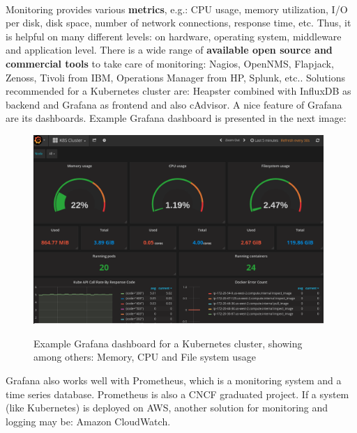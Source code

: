 \paragraph{}
Monitoring provides various \textbf{metrics}, e.g.: CPU usage, memory utilization, I/O per disk, disk space, number of network connections, response time, etc. Thus, it is helpful on many different levels: on hardware, operating system,  middleware and application level. There is a wide range of \textbf{available open source and commercial tools} to take care of monitoring: Nagios, OpenNMS, Flapjack, Zenoss, Tivoli from IBM, Operations Manager from HP, Splunk, etc.\cite{book-cicd}. Solutions recommended for a Kubernetes cluster are: Heapster combined with InfluxDB as backend and Grafana as frontend and also cAdvisor\cite{book-mastering-k8s}. A nice feature of Grafana are its dashboards. Example Grafana dashboard is presented in the next image:
\begin{figure}[H]
  \centering
  \includegraphics[width=11cm]{figures/grafana.png}
  \label{fig:grafana}
  \caption{Example Grafana dashboard for a Kubernetes cluster, showing among others: Memory, CPU and File system usage\cite{monitor-kubernetes-cluster-prometheus-grafana}}
\end{figure}
Grafana also works well with Prometheus, which is a monitoring system and a time series database. Prometheus is also a CNCF graduated project\cite{online-prometheus-gh}\cite{online-prometheus-www}. If a system (like Kubernetes) is deployed on AWS, another solution for monitoring and logging may be: Amazon CloudWatch\cite{online-cw}.

